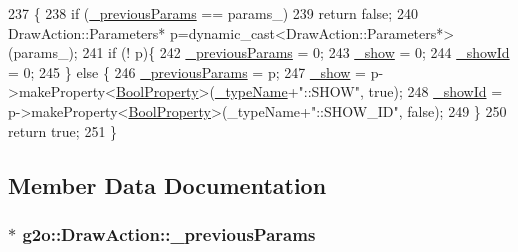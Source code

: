 \begin{DoxyCode}
237                                                                                 \{
238     \textcolor{keywordflow}{if} (\hyperlink{classg2o_1_1DrawAction_af598eb77ea4e27a1c0a27533c971639d}{\_previousParams} == params\_)
239       \textcolor{keywordflow}{return} \textcolor{keyword}{false};
240     DrawAction::Parameters* p=\textcolor{keyword}{dynamic\_cast<}DrawAction::Parameters*\textcolor{keyword}{>}(params\_);
241     \textcolor{keywordflow}{if} (! p)\{
242       \hyperlink{classg2o_1_1DrawAction_af598eb77ea4e27a1c0a27533c971639d}{\_previousParams} = 0;
243       \hyperlink{classg2o_1_1DrawAction_a1ec3a46473daeb8ac65e6a523a9248b6}{\_show} = 0;
244       \hyperlink{classg2o_1_1DrawAction_ab5f870bf2a931e64bc994c87c4212ad3}{\_showId} = 0;
245     \} \textcolor{keywordflow}{else} \{
246       \hyperlink{classg2o_1_1DrawAction_af598eb77ea4e27a1c0a27533c971639d}{\_previousParams} = p;
247       \hyperlink{classg2o_1_1DrawAction_a1ec3a46473daeb8ac65e6a523a9248b6}{\_show} = p->makeProperty<\hyperlink{namespaceg2o_a28e624fedcafeb2b049be2930421071f}{BoolProperty}>(\hyperlink{classg2o_1_1HyperGraphElementAction_ae05082e218d213f8db5de7a79769f97c}{\_typeName}+\textcolor{stringliteral}{"::SHOW"}, \textcolor{keyword}{true});
248       \hyperlink{classg2o_1_1DrawAction_ab5f870bf2a931e64bc994c87c4212ad3}{\_showId} = p->makeProperty<\hyperlink{namespaceg2o_a28e624fedcafeb2b049be2930421071f}{BoolProperty}>(\_typeName+\textcolor{stringliteral}{"::SHOW\_ID"}, \textcolor{keyword}{false});
249     \}
250     \textcolor{keywordflow}{return} \textcolor{keyword}{true};
251   \}
\end{DoxyCode}


\subsection{Member Data Documentation}
\subsubsection[{\texorpdfstring{\+\_\+previous\+Params}{_previousParams}}]{$\ast$ g2o\+::\+Draw\+Action\+::\+\_\+previous\+Params\hspace{0.3cm}{\ttfamily [protected]}}\hypertarget{classg2o_1_1DrawAction_af598eb77ea4e27a1c0a27533c971639d}{}\label{classg2o_1_1DrawAction_af598eb77ea4e27a1c0a27533c971639d}


